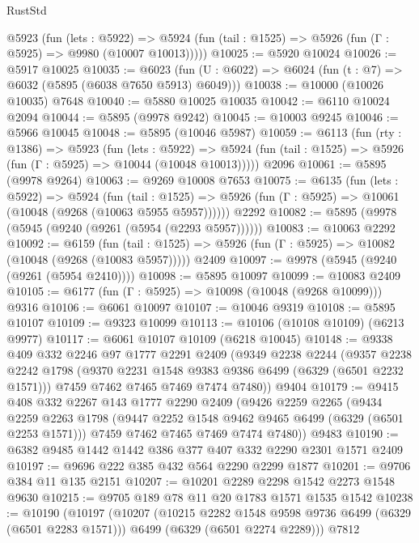 \begin{lexlean}{RustStd}
\begin{coremodule}
{{    @5923
      (fun (lets : @5922) =>
      @5924 (fun (tail : @1525) => @5926 (fun (Γ : @5925) => @9980 (@10007 @10013)))))
@10025 := @5920 @10024
@10026 := @5917 @10025
@10035 := @6023 (fun (U : @6022) => @6024 (fun (t : @7) => @6032 (@5895 (@6038 @7650 @5913) @6049)))
@10038 := @10000 (@10026 @10035) @7648
@10040 := @5880 @10025 @10035
@10042 := @6110 @10024 @2094
@10044 := @5895 (@9978 @9242)
@10045 := @10003 @9245
@10046 := @5966 @10045
@10048 := @5895 (@10046 @5987)
@10059 := @6113
    (fun (rty : @1386) =>
    @5923
      (fun (lets : @5922) =>
      @5924 (fun (tail : @1525) => @5926 (fun (Γ : @5925) => @10044 (@10048 @10013)))))
    @2096
@10061 := @5895 (@9978 @9264)
@10063 := @9269 @10008 @7653
@10075 := @6135
    (fun (lets : @5922) =>
    @5924
      (fun (tail : @1525) =>
      @5926 (fun (Γ : @5925) => @10061 (@10048 (@9268 (@10063 @5955 @5957))))))
    @2292
@10082 := @5895 (@9978 (@5945 (@9240 (@9261 (@5954 (@2293 @5957))))))
@10083 := @10063 @2292
@10092 := @6159
    (fun (tail : @1525) => @5926 (fun (Γ : @5925) => @10082 (@10048 (@9268 (@10083 @5957)))))
    @2409
@10097 := @9978 (@5945 (@9240 (@9261 (@5954 @2410))))
@10098 := @5895 @10097
@10099 := @10083 @2409
@10105 := @6177 (fun (Γ : @5925) => @10098 (@10048 (@9268 @10099))) @9316
@10106 := @6061 @10097
@10107 := @10046 @9319
@10108 := @5895 @10107
@10109 := @9323 @10099
@10113 := @10106 (@10108 @10109) (@6213 @9977)
@10117 := @6061 @10107 @10109 (@6218 @10045)
@10148 := @9338
    @409
    @332
    @2246
    @97
    @1777
    @2291
    @2409
    (@9349
      @2238
      @2244
      (@9357
        @2238
        @2242
        @1798
        (@9370 @2231 @1548 @9383 @9386 @6499 (@6329 (@6501 @2232 @1571)))
        @7459
        @7462
        @7465
        @7469
        @7474
        @7480))
    @9404
@10179 := @9415
    @408
    @332
    @2267
    @143
    @1777
    @2290
    @2409
    (@9426
      @2259
      @2265
      (@9434
        @2259
        @2263
        @1798
        (@9447 @2252 @1548 @9462 @9465 @6499 (@6329 (@6501 @2253 @1571)))
        @7459
        @7462
        @7465
        @7469
        @7474
        @7480))
    @9483
@10190 := @6382 @9485 @1442 @1442 @386 @377 @407 @332 @2290 @2301 @1571 @2409
@10197 := @9696 @222 @385 @432 @564 @2290 @2299 @1877
@10201 := @9706 @384 @11 @135 @2151
@10207 := @10201 @2289 @2298 @1542 @2273 @1548 @9630
@10215 := @9705 @189 @78 @11 @20 @1783 @1571 @1535 @1542
@10238 := @10190
    (@10197
      (@10207
        (@10215 @2282 @1548 @9598 @9736 @6499 (@6329 (@6501 @2283 @1571)))
        @6499
        (@6329 (@6501 @2274 @2289)))
      @7812
}}
\end{coremodule}
\end{lexlean}

